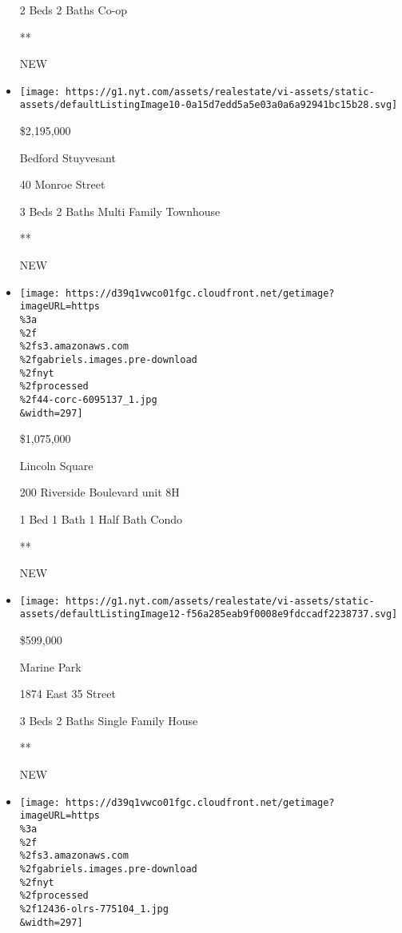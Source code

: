 \begin{itemize}
  2 Beds \textbar{} 2 Baths \textbar{} Co-op

  **

  NEW
\item
  \href{/real-estate/usa/ny/brooklyn/bedford-stuyvesant/homes-for-sale/40-monroe-street/12436-OLRS-0042256?}{}

  \texttt{[image: https://g1.nyt.com/assets/realestate/vi-assets/static-assets/defaultListingImage10-0a15d7edd5a5e03a0a6a92941bc15b28.svg]}

  \$2,195,000

  Bedford Stuyvesant

  40 Monroe Street

  3 Beds \textbar{} 2 Baths \textbar{} Multi Family Townhouse

  **

  NEW
\item
  \href{/real-estate/usa/ny/new-york/lincoln-square/homes-for-sale/200-riverside-boulevard/44-CORC-6095137?}{}

  \texttt{[image: https://d39q1vwco01fgc.cloudfront.net/getimage?imageURL=https\\\%3a\\\%2f\\\%2fs3.amazonaws.com\\\%2fgabriels.images.pre-download\\\%2fnyt\\\%2fprocessed\\\%2f44-corc-6095137\_1.jpg\\\&width=297]}

  \$1,075,000

  Lincoln Square

  200 Riverside Boulevard unit 8H

  1 Bed \textbar{} 1 Bath \textbar{} 1 Half Bath \textbar{} Condo

  **

  NEW
\item
  \href{/real-estate/usa/ny/brooklyn/marine-park/homes-for-sale/1874-east-35-street/14888-5535302?}{}

  \texttt{[image: https://g1.nyt.com/assets/realestate/vi-assets/static-assets/defaultListingImage12-f56a285eab9f0008e9fdccadf2238737.svg]}

  \$599,000

  Marine Park

  1874 East 35 Street

  3 Beds \textbar{} 2 Baths \textbar{} Single Family House

  **

  NEW
\item
  \href{/real-estate/usa/ny/new-york/kips-bay/homes-for-sale/140-east-28th-street/12436-OLRS-775104?}{}

  \texttt{[image: https://d39q1vwco01fgc.cloudfront.net/getimage?imageURL=https\\\%3a\\\%2f\\\%2fs3.amazonaws.com\\\%2fgabriels.images.pre-download\\\%2fnyt\\\%2fprocessed\\\%2f12436-olrs-775104\_1.jpg\\\&width=297]}


\end{itemize}
